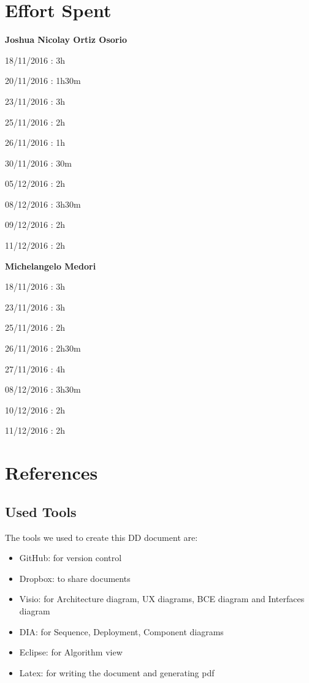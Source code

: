 \documentclass{article}
\begin{document}
\begin{flushleft}
\begin{description}
\end{description}
\newpage
\section{Effort Spent} %

\textbf{Joshua Nicolay Ortiz Osorio} \break
\begin{description}
\item 18/11/2016 : 3h
\item 20/11/2016 : 1h30m
\item 23/11/2016 : 3h
\item 25/11/2016 : 2h
\item 26/11/2016 : 1h
\item 30/11/2016 : 30m
\item 05/12/2016 : 2h
\item 08/12/2016 : 3h30m
\item 09/12/2016 : 2h
\item 11/12/2016 : 2h
\end{description}
\vspace{2cm}

\textbf{Michelangelo Medori} \break
\begin{description}
\item 18/11/2016 : 3h
\item 23/11/2016 : 3h
\item 25/11/2016 : 2h
\item 26/11/2016 : 2h30m
\item 27/11/2016 : 4h
\item 08/12/2016 : 3h30m 
\item 10/12/2016 : 2h
\item 11/12/2016 : 2h
\end{description}

\newpage
\section{References}
\subsection{Used Tools} %
The tools we used to create this DD document are:
\begin{itemize}

\item GitHub: for version control
\item Dropbox: to share documents
\item Visio: for Architecture diagram, UX diagrams, BCE diagram and Interfaces diagram
\item DIA: for Sequence, Deployment, Component diagrams
\item Eclipse: for Algorithm view
\item Latex: for writing the document and generating pdf


\end{itemize}
\end{flushleft}
\end{document}
